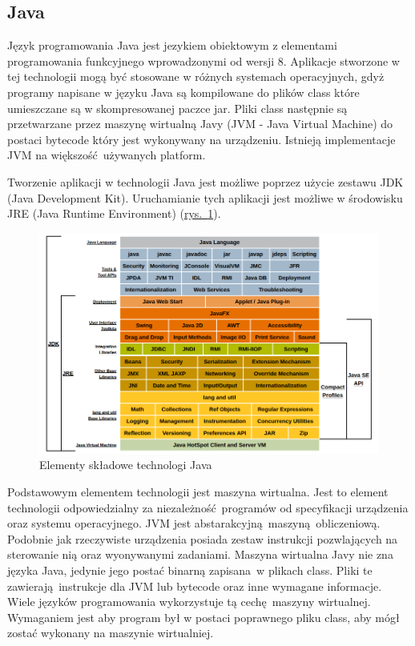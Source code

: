 \subsection{Java}
Język programowania Java jest jezykiem obiektowym z elementami programowania funkcyjnego wprowadzonymi od wersji 8. Aplikacje stworzone w tej technologii mogą być stosowane w różnych systemach operacyjnych, gdyż programy napisane w języku Java są kompilowane do plików class które umieszczane są w skompresowanej paczce jar. Pliki class następnie są przetwarzane przez maszynę wirtualną Javy (JVM - Java Virtual Machine) do postaci bytecode który jest wykonywany na urządzeniu. Istnieją implementacje JVM na większość używanych platform.

Tworzenie aplikacji w technologii Java jest możliwe poprzez użycie zestawu JDK (Java Development Kit). Uruchamianie tych aplikacji jest możliwe w środowisku JRE (Java Runtime Environment)  (\hyperref[fig:java_arch]{rys.~\ref*{fig:java_arch}}).

\begin{figure}[h]
  \center
  \includegraphics[scale=0.4]{../image/java_arch.png}
  \caption{Elementy składowe technologi Java \cite{OracleJavaArch}}
  \label{fig:java_arch}
\end{figure}

Podstawowym elementem technologii jest maszyna wirtualna. Jest to element technologii odpowiedzialny za niezależność programów od specyfikacji urządzenia oraz systemu operacyjnego. JVM jest abstarakcyjną maszyną obliczeniową. Podobnie jak rzeczywiste urządzenia posiada zestaw instrukcji pozwlających na sterowanie nią oraz wyonywanymi zadaniami. Maszyna wirtualna Javy nie zna języka Java, jedynie jego postać binarną zapisana w plikach class. Pliki te zawierają instrukcje dla JVM lub bytecode oraz inne wymagane informacje. Wiele języków programowania wykorzystuje tą cechę maszyny wirtualnej. Wymaganiem jest aby program był w postaci poprawnego pliku class, aby mógł zostać wykonany na maszynie wirtualniej.

